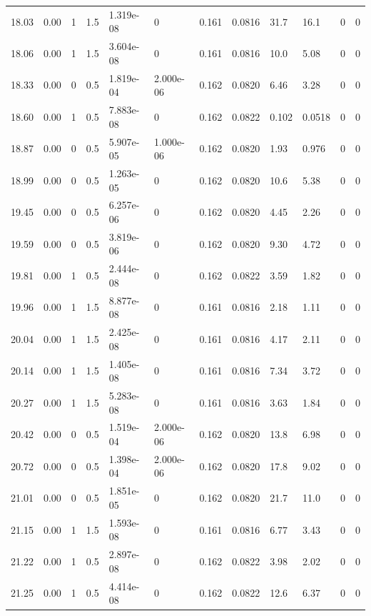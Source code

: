 \documentclass[preview]{standalone}
\begin{document}
{{{\begin{tabular}{L{1.2cm}C{1.2cm} C{0.3cm}C{0.5cm} C{1.4cm}C{1.4cm} C{1.4cm}C{1.4cm} C{1.6cm}C{1.6cm} C{1.6cm}C{1.6cm}}
  18.03  &  0.00  & 1     & 1.5 &  1.319e-08  & 0  &  0.161&   0.0816& 31.7 & 16.1   &  0 & 0  \\ 
  18.06  &  0.00  & 1     & 1.5 &  3.604e-08  & 0  &  0.161&   0.0816& 10.0 & 5.08   &  0 & 0  \\ 
  18.33  &  0.00  & 0     & 0.5 &  1.819e-04  & 2.000e-06  &  0.162&   0.0820& 6.46 & 3.28   &  0 & 0  \\ 
  18.60  &  0.00  & 1     & 0.5 &  7.883e-08  & 0  &  0.162&   0.0822& 0.102 & 0.0518   &  0 & 0  \\ 
  18.87  &  0.00  & 0     & 0.5 &  5.907e-05  & 1.000e-06  &  0.162&   0.0820& 1.93 & 0.976   &  0 & 0  \\ 
  18.99  &  0.00  & 0     & 0.5 &  1.263e-05  & 0  &  0.162&   0.0820& 10.6 & 5.38   &  0 & 0  \\ 
  19.45  &  0.00  & 0     & 0.5 &  6.257e-06  & 0  &  0.162&   0.0820& 4.45 & 2.26   &  0 & 0  \\ 
  19.59  &  0.00  & 0     & 0.5 &  3.819e-06  & 0  &  0.162&   0.0820& 9.30 & 4.72   &  0 & 0  \\ 
  19.81  &  0.00  & 1     & 0.5 &  2.444e-08  & 0  &  0.162&   0.0822& 3.59 & 1.82   &  0 & 0  \\ 
  19.96  &  0.00  & 1     & 1.5 &  8.877e-08  & 0  &  0.161&   0.0816& 2.18 & 1.11   &  0 & 0  \\ 
  20.04  &  0.00  & 1     & 1.5 &  2.425e-08  & 0  &  0.161&   0.0816& 4.17 & 2.11   &  0 & 0  \\ 
  20.14  &  0.00  & 1     & 1.5 &  1.405e-08  & 0  &  0.161&   0.0816& 7.34 & 3.72   &  0 & 0  \\ 
  20.27  &  0.00  & 1     & 1.5 &  5.283e-08  & 0  &  0.161&   0.0816& 3.63 & 1.84   &  0 & 0  \\ 
  20.42  &  0.00  & 0     & 0.5 &  1.519e-04  & 2.000e-06  &  0.162&   0.0820& 13.8 & 6.98   &  0 & 0  \\ 
  20.72  &  0.00  & 0     & 0.5 &  1.398e-04  & 2.000e-06  &  0.162&   0.0820& 17.8 & 9.02   &  0 & 0  \\ 
  21.01  &  0.00  & 0     & 0.5 &  1.851e-05  & 0  &  0.162&   0.0820& 21.7 & 11.0   &  0 & 0  \\ 
  21.15  &  0.00  & 1     & 1.5 &  1.593e-08  & 0  &  0.161&   0.0816& 6.77 & 3.43   &  0 & 0  \\ 
  21.22  &  0.00  & 1     & 0.5 &  2.897e-08  & 0  &  0.162&   0.0822& 3.98 & 2.02   &  0 & 0  \\ 
  21.25  &  0.00  & 1     & 0.5 &  4.414e-08  & 0  &  0.162&   0.0822& 12.6 & 6.37   &  0 & 0  \\ 

\end{tabular}}}}
\end{document}
